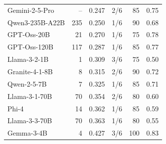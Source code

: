 \begin{table}[t]
\begin{tabular}{l r r c r r}
Gemini-2-5-Pro & -- & 0.247 & 2/6 & 85 & 0.75 \\
Qwen3-235B-A22B & 235 & 0.250 & 1/6 & 90 & 0.68 \\
GPT-Oss-20B & 21 & 0.270 & 1/6 & 75 & 0.78 \\
GPT-Oss-120B & 117 & 0.287 & 1/6 & 85 & 0.77 \\
Llama-3-2-1B & 1 & 0.309 & 3/6 & 75 & 0.50 \\
Granite-4-1-8B & 8 & 0.315 & 2/6 & 90 & 0.72 \\
Qwen-2-5-7B & 7 & 0.325 & 1/6 & 85 & 0.71 \\
Llama-3-1-70B & 70 & 0.354 & 2/6 & 80 & 0.60 \\
Phi-4 & 14 & 0.362 & 1/6 & 85 & 0.59 \\
Llama-3-3-70B & 70 & 0.363 & 1/6 & 80 & 0.55 \\
Gemma-3-4B & 4 & 0.427 & 3/6 & 100 & 0.83 \\
\bottomrule
\end{tabular}
\end{table}
